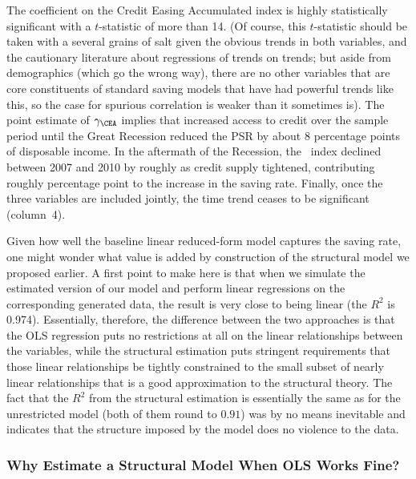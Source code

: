 \documentclass[titlepage]{\econtex}
\begin{document}
The coefficient on the Credit Easing Accumulated index is highly statistically significant with a $t$-statistic of more than 14. (Of course, this $t$-statistic should be taken with a several grains of salt given the obvious trends in both variables, and the cautionary literature about regressions of trends on trends; but aside from demographics (which go the wrong way), there are no other variables that are core constituents of standard saving models that have had powerful trends like this, so the case for spurious correlation is weaker than it sometimes is).  The point estimate of $\gamma _{\CEA}$ implies that increased access to credit over the sample period until the Great Recession reduced the PSR by about 8 percentage points of disposable income. In the aftermath of the Recession, the \CEA\ index declined between 2007 and 2010 by roughly  as credit supply tightened, contributing roughly  percentage point to the increase in the saving rate.  Finally, once the three variables are included jointly, the time trend ceases to be significant (column~4).

Given how well the baseline linear reduced-form model captures the saving rate, one might wonder what value is added by construction of the structural model we proposed earlier.  A first point to make here is that when we simulate the estimated version of our model and perform linear regressions on the corresponding generated data, the result is very close to being linear (the $R^{2}$ is 0.974).  Essentially, therefore, the difference between the two approaches is that the OLS regression puts no restrictions at all on the linear relationships between the variables, while the structural estimation puts stringent requirements that those linear relationships be tightly constrained to the small subset of nearly linear relationships that is a good approximation to the structural theory.  The fact that the $R^{2}$ from the structural estimation is essentially the same as for the unrestricted model (both of them round to $0.91$) was by no means inevitable and indicates that the structure imposed by the model does no violence to the data.%

\hypertarget{Why-Estimate-a-Structural-Model}{}

\subsubsection{Why Estimate a Structural Model When OLS Works Fine?}
\end{document}
